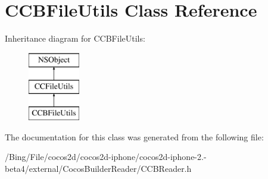 \hypertarget{interface_c_c_b_file_utils}{\section{C\-C\-B\-File\-Utils Class Reference}
\label{interface_c_c_b_file_utils}
}
Inheritance diagram for C\-C\-B\-File\-Utils\-:\begin{figure}[H]
\begin{center}
\leavevmode
\includegraphics[height=3.000000cm]{interface_c_c_b_file_utils}
\end{center}
\end{figure}


The documentation for this class was generated from the following file\-:\begin{DoxyCompactItemize}
\item 
/\-Bing/\-File/cocos2d/cocos2d-\/iphone/cocos2d-\/iphone-\/2.-\/beta4/external/\-Cocos\-Builder\-Reader/C\-C\-B\-Reader.\-h\end{DoxyCompactItemize}
